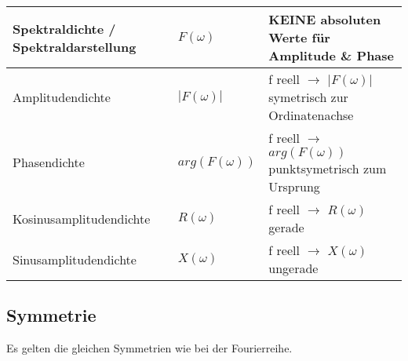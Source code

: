 \begin{tabular}{|l|l|l|}
\hline
Spektraldichte / Spektraldarstellung	& $F(\omega)$ 		& KEINE absoluten Werte für Amplitude \& Phase \\
\hline
Amplitudendichte 						& $|F(\omega)|$		& f reell $\rightarrow$ $|F(\omega)|$ symetrisch zur Ordinatenachse \\
\hline
Phasendichte							& $arg(F(\omega))$	& f reell $\rightarrow$ $arg(F(\omega))$ punktsymetrisch zum Ursprung \\
\hline
Kosinusamplitudendichte					& $R(\omega)$		& f reell $\rightarrow$ $R(\omega)$ gerade \\
\hline
Sinusamplitudendichte					& $X(\omega)$ 		& f reell $\rightarrow$ $X(\omega)$ ungerade \\
\hline
\end{tabular}


\subsection{Symmetrie}
	Es gelten die gleichen Symmetrien wie bei der Fourierreihe.
		
